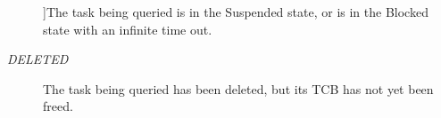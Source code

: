 \begin{Desc}
\begin{description}
{}]The task being queried is in the Suspended state, or is in the Blocked state with an infinite time out. \item[{\em 
\hypertarget{group___r_t_o_s_gga25ee4013cc565a18ac2f4039b4ad441baae88752b9379248f07e2c3fdc064d998}{D\-E\-L\-E\-T\-E\-D}\label{group___r_t_o_s_gga25ee4013cc565a18ac2f4039b4ad441baae88752b9379248f07e2c3fdc064d998}
}]The task being queried has been deleted, but its T\-C\-B has not yet been freed. \end{description}
\end{Desc}
